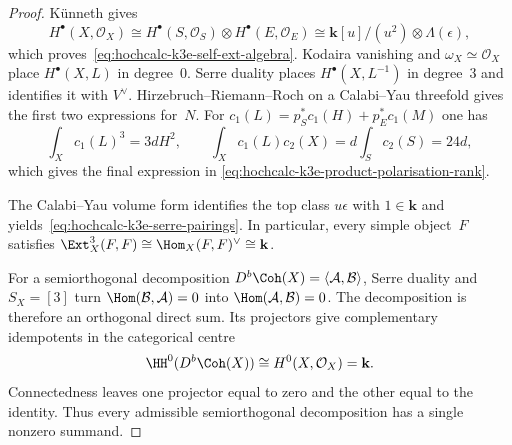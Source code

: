 \begin{proof}
K\"unneth gives
\[
 H^\bullet(X,\mathcal O_X)
 \cong H^\bullet(S,\mathcal O_S)\otimes
       H^\bullet(E,\mathcal O_E)
 \cong \mathbf k[u]/(u^2)\otimes\Lambda(\epsilon),
\]
which proves~\eqref{eq:hochcalc-k3e-self-ext-algebra}.  Kodaira
vanishing and $\omega_X\simeq\mathcal O_X$ place $H^\bullet(X,L)$ in
degree~$0$.  Serre duality places $H^\bullet(X,L^{-1})$ in degree~$3$
and identifies it with $V^\vee$.  Hirzebruch--Riemann--Roch on a
Calabi--Yau threefold gives the first two expressions for~$N$.  For
$c_1(L)=p_S^*c_1(H)+p_E^*c_1(M)$ one has
\[
 \int_Xc_1(L)^3=3dH^2,
 \qquad
 \int_Xc_1(L)c_2(X)=d\int_Sc_2(S)=24d,
\]
which gives the final expression in
\eqref{eq:hochcalc-k3e-product-polarisation-rank}.

The Calabi--Yau volume form identifies the top class $u\epsilon$ with
$1\in\mathbf k$ and yields~\eqref{eq:hochcalc-k3e-serre-pairings}.
In particular, every simple object~$F$ satisfies
$\Ext_X^3(F,F)\cong\Hom_X(F,F)^\vee\cong\mathbf k$.

For a semiorthogonal decomposition
$D^b\Coh(X)=\langle\mathcal A,\mathcal B\rangle$, Serre duality and
$S_X=[3]$ turn $\Hom(\mathcal B,\mathcal A)=0$ into
$\Hom(\mathcal A,\mathcal B)=0$.  The decomposition is therefore an
orthogonal direct sum.  Its projectors give complementary idempotents
in the categorical centre
\[
 \HH^0(D^b\Coh(X))\cong H^0(X,\mathcal O_X)=\mathbf k.
\]
Connectedness leaves one projector equal to zero and the other equal
to the identity.  Thus every admissible semiorthogonal decomposition
has a single nonzero summand.
\end{proof}

